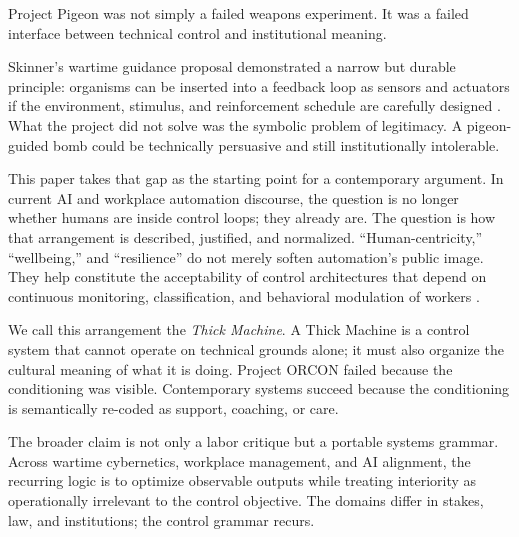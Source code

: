 \documentclass[runningheads]{llncs}
\begin{document}
Project Pigeon was not simply a failed weapons experiment. It was a failed interface between technical control and institutional meaning.

Skinner's wartime guidance proposal demonstrated a narrow but durable principle: organisms can be inserted into a feedback loop as sensors and actuators if the environment, stimulus, and reinforcement schedule are carefully designed \cite{skinner1960pigeons,capshew1993engineering}. What the project did not solve was the symbolic problem of legitimacy. A pigeon-guided bomb could be technically persuasive and still institutionally intolerable.

This paper takes that gap as the starting point for a contemporary argument. In current AI and workplace automation discourse, the question is no longer whether humans are inside control loops; they already are. The question is how that arrangement is described, justified, and normalized. ``Human-centricity,'' ``wellbeing,'' and ``resilience'' do not merely soften automation's public image. They help constitute the acceptability of control architectures that depend on continuous monitoring, classification, and behavioral modulation of workers \cite{breque2021industry,kellogg2020algorithms}.

We call this arrangement the \emph{Thick Machine}. A Thick Machine is a control system that cannot operate on technical grounds alone; it must also organize the cultural meaning of what it is doing. Project ORCON failed because the conditioning was visible. Contemporary systems succeed because the conditioning is semantically re-coded as support, coaching, or care.

The broader claim is not only a labor critique but a portable systems grammar. Across wartime cybernetics, workplace management, and AI alignment, the recurring logic is to optimize observable outputs while treating interiority as operationally irrelevant to the control objective. The domains differ in stakes, law, and institutions; the control grammar recurs.
\end{document}
